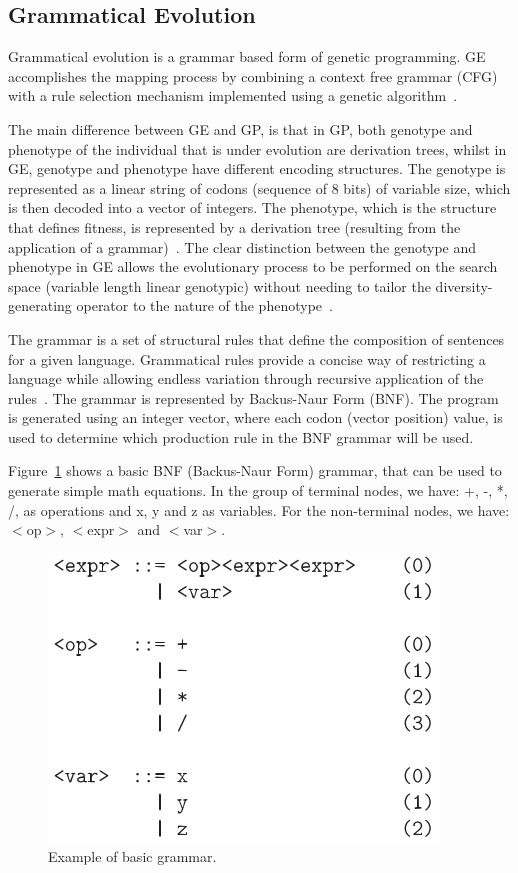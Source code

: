 \documentclass[journal]{IEEEtran}
\begin{document}
	
	\subsection{Grammatical Evolution} \label{subsection:grammaticalEvolution}
	
	Grammatical evolution is a grammar based form of genetic programming. GE accomplishes the mapping process by combining a context free grammar (CFG) with a rule selection mechanism implemented using a genetic algorithm~\cite{byrne2015optimising}.
	
	The main difference between GE and GP, is that in GP, both genotype and phenotype of the individual that is under evolution are derivation trees, whilst in GE, genotype and phenotype have different encoding structures. The genotype is represented as a linear string of codons (sequence of 8 bits) of variable size, which is then decoded into a vector of integers. The phenotype, which is the structure that defines fitness, is represented by a derivation tree (resulting from the application of a grammar)~\cite{cerri2013grammatical}. The clear distinction between the genotype and phenotype in GE allows the evolutionary process to be performed on the search space (variable length linear genotypic) without needing to tailor the diversity-generating operator to the nature of the phenotype~\cite{sabar2013grammatical}.
	
	The grammar is a set of structural rules that define the composition of sentences for a given language. Grammatical rules provide a concise way of restricting a language while allowing endless variation through recursive application of the rules~\cite{byrne2015optimising}. The grammar is represented by Backus-Naur Form (BNF). The program is generated using an integer vector, where each codon (vector position) value, is used to determine which production rule in the BNF grammar will be used.
	
	Figure~\ref{fig:grammar} shows a basic BNF (Backus-Naur Form) grammar, that can be used to generate simple math equations. In the group of terminal nodes, we have: +, -, *, /, as operations and x, y and z as variables. For the non-terminal nodes, we have: $<$op$>$, $<$expr$>$ and $<$var$>$.

	\begin{figure}[!htb]
		\centering
		\includegraphics[scale=.6]{figures/grammar.png}
		\caption{Example of basic grammar.~\cite{ryan1998grammatical}}
		\label{fig:grammar}
	\end{figure}
	
\end{document}
